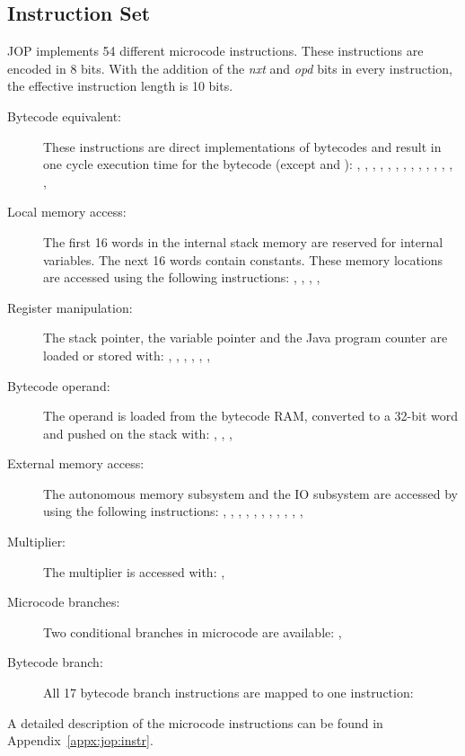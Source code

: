 \subsection{Instruction Set}

JOP implements 54 different microcode instructions. These
instructions are encoded in 8 bits. With the addition of the
\emph{nxt} and \emph{opd} bits in every instruction, the effective
instruction length is 10 bits.

\begin{description}
    \item[Bytecode equivalent:]
These instructions are direct implementations of bytecodes and
result in one cycle execution time for the bytecode (except
 and ): , , ,
, , , , ,
, , , , ,
, 

    \item[Local memory access:]
The first 16 words in the internal stack memory are reserved for
internal variables. The next 16 words contain constants. These
memory locations are accessed using the following instructions:
, , , , 

    \item[Register manipulation:]
The stack pointer, the variable pointer and the Java program counter
are loaded or stored with: , , ,
, , , 

    \item[Bytecode operand:]
The operand is loaded from the bytecode RAM, converted to a 32-bit
word and pushed on the stack with: ,
, , 

    \item[External memory access:]
The autonomous memory subsystem and the IO subsystem are accessed by
using the following instructions: , ,
, , , ,
, , , ,
, 

    \item[Multiplier:]
The multiplier is accessed with: , 

    \item[Microcode branches:]
Two conditional branches in microcode are available: ,

    \item[Bytecode branch:]
All 17 bytecode branch instructions are mapped to one instruction:

\end{description}
%
A detailed description of the microcode instructions can be found in
Appendix~\ref{appx:jop:instr}.

